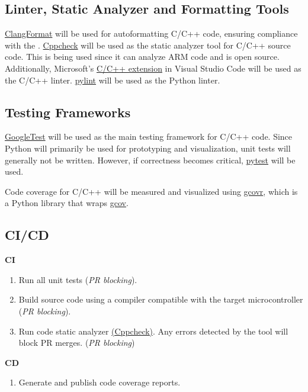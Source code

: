 \documentclass{article}
\begin{document}
\subsection{Linter, Static Analyzer and Formatting Tools}
\label{sec:linter}
\label{sec:static_analyzer_tool}

\href{https://clang.llvm.org/docs/ClangFormat.html}{ClangFormat} will be used
for autoformatting C/C++ code, ensuring compliance with the
.
\href{https://cppcheck.sourceforge.io/}{Cppcheck} will be used as
the static analyzer tool for C/C++ source code. This is being used since
it can analyze ARM code and is open source.
Additionally, Microsoft’s
\href{https://code.visualstudio.com/docs/languages/cpp}{C/C++ extension} in
Visual Studio Code will be used as the C/C++ linter.
\href{https://pypi.org/project/pylint/}{pylint} will be used as the Python
linter.

\subsection{Testing Frameworks}
\href{https://github.com/google/googletest}{GoogleTest} will be used as the main
testing framework for C/C++ code. Since Python will primarily be used for
prototyping and visualization, unit tests will generally not be written.
However, if correctness becomes critical,
\href{https://docs.pytest.org/}{pytest} will be used.

Code coverage for C/C++ will be measured and visualized using
\href{https://gcovr.com/en/stable/}{gcovr}, which is a Python library that wraps
\href{https://gcc.gnu.org/onlinedocs/gcc/Gcov.html}{gcov}.

\subsection{CI/CD}

\textbf{CI}
\begin{enumerate}
  \item Run all unit tests (\textit{PR blocking}).
  \item Build source code using a compiler compatible with the target
  microcontroller (\textit{PR blocking}).
  \item Run code static analyzer
  \hyperref[sec:static_analyzer_tool]{(Cppcheck)}.
  Any errors detected by the tool will block PR merges. (\textit{PR blocking})
\end{enumerate}
\textbf{CD} %
\begin{enumerate}
    \item Generate and publish code coverage reports.
\end{enumerate}
\end{document}
